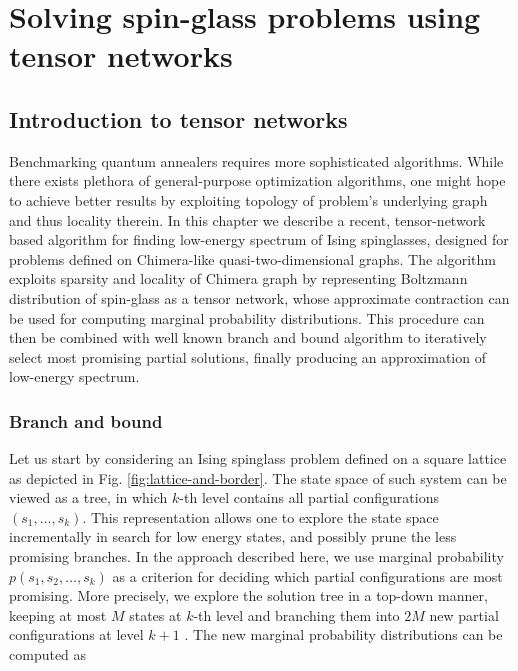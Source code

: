 \chapter{Solving spin-glass problems using tensor networks}

\section{Introduction to tensor networks}

Benchmarking quantum annealers requires more sophisticated algorithms. 
While there exists plethora of general-purpose optimization algorithms, one might hope to achieve better results by exploiting topology of problem's underlying graph and thus locality therein. In this chapter we describe a recent, tensor-network based algorithm for finding low-energy spectrum of Ising spinglasses, designed for problems defined on Chimera-like quasi-two-dimensional graphs. The algorithm exploits sparsity and locality of Chimera graph by representing Boltzmann distribution of spin-glass as a tensor network, whose approximate contraction can be used for computing marginal probability distributions. This procedure can then be combined with well known branch and bound algorithm to iteratively select most promising partial solutions, finally producing an approximation of low-energy spectrum.


\subsection{Branch and bound}
Let us start by considering an Ising spinglass problem defined on a square lattice as depicted in Fig. \ref{fig:lattice-and-border}.  The state space of such system can be viewed as a tree, in which $k$-th level contains all partial configurations $(s_1, \ldots, s_k)$. This representation allows one to explore the state space incrementally in search for low energy states, and possibly prune the less promising branches. In the approach described here, we use marginal probability $p(s_1, s_2, \ldots, s_k)$ as a criterion for deciding which partial configurations are most promising. More precisely, we explore the solution tree in a top-down manner, keeping at most $M$ states at $k$-th level and branching them into $2M$ new partial configurations at level $k+1$ . The new marginal probability distributions can be computed as

